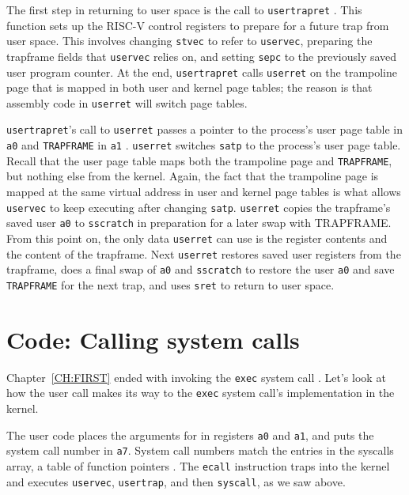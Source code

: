 The first step in returning to user space is the call to {\tt usertrapret}
.
This function sets up the RISC-V control registers to prepare for a
future trap from user space. This involves changing {\tt stvec}
to refer to {\tt uservec}, preparing the trapframe fields that
{\tt uservec} relies on, and setting {\tt sepc} to the previously
saved user program counter. At the end, {\tt usertrapret}
calls {\tt userret} on the trampoline page that is mapped in
both user and kernel page tables; the reason is that assembly
code in {\tt userret} will switch page tables.

{\tt usertrapret}'s call to {\tt userret} passes a pointer to the process's user
page table in {\tt a0} and {\tt TRAPFRAME} in {\tt a1}
.
{\tt userret} switches {\tt satp} to the process's user page table.
Recall that the user page table maps both the trampoline page
and {\tt TRAPFRAME}, but nothing else from the kernel.
Again, the fact that the trampoline page is mapped at the same
virtual address in user and kernel page tables is what allows
{\tt uservec} to keep executing after changing {\tt satp}.
{\tt userret} copies the trapframe's saved user {\tt a0} to {\tt sscratch}
in preparation for a later swap with TRAPFRAME.
From this point on, the only data {\tt userret} can use is
the register contents and the content of the trapframe.
Next {\tt userret} restores saved user registers from the trapframe,
does a final swap of {\tt a0} and {\tt sscratch} to restore the
user {\tt a0} and save {\tt TRAPFRAME} for the next trap,
and uses {\tt sret} to return to user space.

\section{Code: Calling system calls}

Chapter~\ref{CH:FIRST} ended with 
invoking the {\tt exec} system call
.
Let's look at how the user call
makes its way to the {\tt exec} system call's
implementation in the kernel.

The user code places the arguments for
in registers {\tt a0} and {\tt a1}, and puts the
system call number in
\texttt{a7}.
System call numbers match the entries in the syscalls array,
a table of function pointers
.
The \lstinline{ecall} instruction traps into the kernel
and executes {\tt uservec},
{\tt usertrap}, and then {\tt syscall}, as we saw above.

